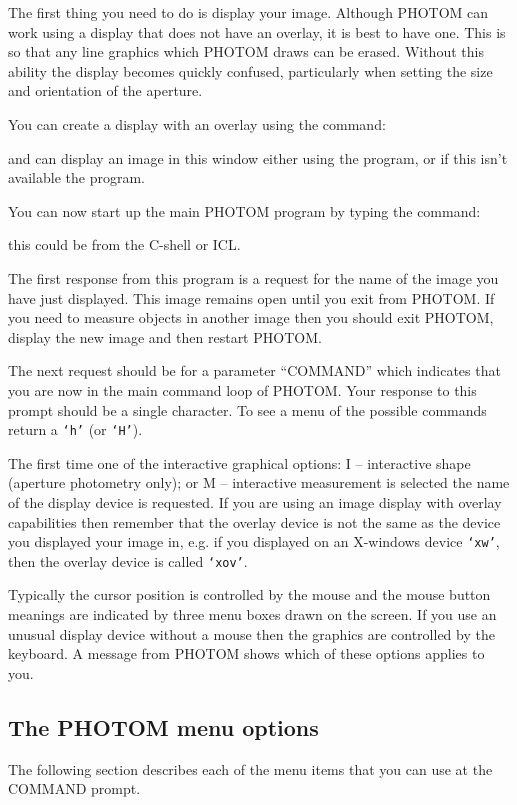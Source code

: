 \documentclass[twoside,11pt,nolof]{starlink}
\providecommand{\st}[1]{\texttt{`#1'}}
\begin{document}
The first thing you need to do is display your image. Although PHOTOM
can work using a display that does not have an overlay, it is best
to have one. This is so that any line graphics which PHOTOM draws can
be erased. Without this ability the display becomes quickly confused,
particularly when setting the size and orientation of the aperture.

You can create a  display with an overlay
using the command:
\begin{terminalv}
\end{terminalv}
and can display an image in this window either using the
 program, or if this isn't available
the  program.

You can now start up the main PHOTOM program by typing the command:
\begin{terminalv}
\end{terminalv}
this could be from the C-shell or ICL.

The first response from this program is a request for the name of the
image you have just displayed. This image remains open until you exit
from PHOTOM. If you need to measure objects in another image then you
should exit PHOTOM, display the new image and then restart PHOTOM.

The next request should be for a parameter ``COMMAND'' which indicates that
you are now in the main command loop of PHOTOM. Your response to this
prompt should be a single character. To see a menu of the possible
commands return a \st{h} (or \st{H}).

The first time one of the interactive graphical options: I --
interactive shape (aperture photometry only); or M -- interactive
measurement is selected the name of the display device is requested.
If you are using an image display with overlay capabilities then
remember that the overlay device is not the same as the device you
displayed your image in, e.g. if you displayed on an X-windows device
\st{xw}, then the overlay device is called \st{xov}.

Typically the cursor position is controlled by the mouse and the mouse
button meanings are indicated by three menu boxes drawn on the screen.
If you use an unusual display device without a mouse then the graphics
are controlled by the keyboard. A message from PHOTOM shows which of
these options applies to you.

\subsection{The PHOTOM menu options}
The following section describes each of the menu items that you can use
at the COMMAND prompt.
\end{document}
